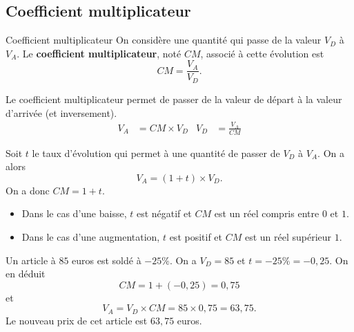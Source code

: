 \documentclass[11pt]{article}
\begin{document}
\subsection{Coefficient multiplicateur}
\begin{defi}{Coefficient multiplicateur}
  On considère une quantité qui passe de la valeur $V_D$ à $V_A$. Le
  \textbf{coefficient multiplicateur}, noté $CM$, associé à cette évolution est
  \[
    CM = \frac{V_A}{V_D}.
  \]
\end{defi}
\begin{prop}
  Le coefficient multiplicateur permet de passer de la valeur de départ à la
  valeur d'arrivée (et inversement).
  \begin{align*}
    V_A &= CM\times V_D &
    V_D &= \frac{V_A}{CM}
  \end{align*}
\end{prop}
\begin{prop}
  \begin{minipage}{0.6\textwidth}
  Soit $t$ le taux d'évolution qui permet à une quantité de passer de $V_D$ à
  $V_A$. On a alors
  \[
    V_A=(1+t)\times V_D.
  \]
  On a donc $CM=1+t$.
\end{minipage}
  \begin{minipage}{0.4\textwidth}
    \begin{center}
\end{center}

  \end{minipage}
\end{prop}
\begin{prop}
  \begin{itemize}
    \item Dans le cas d'une baisse, $t$ est négatif et $CM$ est un réel compris entre
      $0$ et $1$.
    \item Dans le cas d'une augmentation, $t$ est positif et $CM$ est un réel supérieur
      $1$.
  \end{itemize}
\end{prop}
\begin{exemple}
  Un article à $85$ euros est soldé à $-25\%$. On a $V_D=85$ et $t=-25\%=-0,25$.
  On en déduit $$CM=1+(-0,25)=0,75$$ et $$ V_A=V_D\times CM=85\times
  0,75=63,75.$$
  Le nouveau prix de cet article est $63,75$ euros.
\end{exemple}
\end{document}
